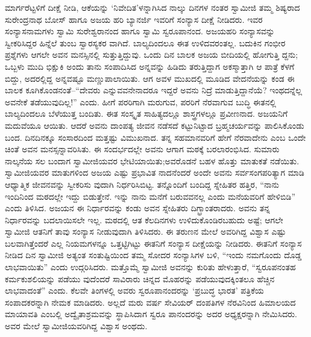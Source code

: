 ಮಾರ್ಗರೆಟ್ಟಳಿಗೆ ದೀಕ್ಷೆ ನೀಡಿ, ಆಕೆಯನ್ನು ‘ನಿವೇದಿತ’ಳನ್ನಾಗಿಸಿದ ನಾಲ್ಕು ದಿನಗಳ ನಂತರ ಸ್ವಾಮೀಜಿ ತಮ್ಮ ಶಿಷ್ಯರಾದ ಸುರೇಂದ್ರನಾಥ ಬೋಸ್ ಹಾಗೂ ಅಜಯ ಹರಿ ಬ್ಯಾನರ್ಜಿ ಇವರಿಗೆ ಸಂನ್ಯಾಸ ದೀಕ್ಷೆ ನೀಡಿದರು. ಇವರ ಸಂನ್ಯಾಸನಾಮಗಳು ಸ್ವಾಮಿ ಸುರೇಶ್ವರಾನಂದ ಹಾಗೂ ಸ್ವಾಮಿ ಸ್ವರೂಪಾನಂದ. ಅಜಯಹರಿ ಸಂನ್ಯಾಸವನ್ನು ಸ್ವೀಕರಿಸಿದ್ದರ ಹಿನ್ನೆಲೆ ತುಂಬ ಸ್ವಾರಸ್ಯಕರ ವಾಗಿದೆ. ಬಾಲ್ಯದಿಂದಲೂ ಈತ ಉಳಿದವರಂತಲ್ಲ. ಬದುಕಿನ ಗಂಭೀರ ಪ್ರಶ್ನೆಗಳು ಆಗಲೇ ಅವನ ಮನಸ್ಸಿನಲ್ಲಿ ಸುತ್ತುತ್ತಿದ್ದುವು. ಒಂದು ದಿನ ಬಾಲಕ ಅಜಯ ಬೀದಿಯಲ್ಲಿ ಹೋಗುತ್ತಿ ದ್ದನು; ಒಬ್ಬಳು ಮುದಿ ಭಿಕ್ಷುಕಿ ಅಂದು ತಾನು ಸಂಪಾದಿಸಿದ ಅನ್ನವನ್ನು ಹಿಡಿದು ತರುತ್ತಿದ್ದಾಗ ಅಕಸ್ಮಾತ್ತಾಗಿ ಆ ಪಾತ್ರೆ ಕೆಳಗೆ ಬಿದ್ದು, ಅದರಲ್ಲಿದ್ದ ಅನ್ನವಷ್ಟೂ ಮಣ್ಣುಪಾಲಾಯಿತು. ಆಗ ಅವಳ ಮುಖದಲ್ಲಿ ಮೂಡಿದ ವೇದನೆಯನ್ನು ಕಂಡ ಈ ಬಾಲಕ ಕೂಗಿಕೊಂಡನಂತೆ–“ದೇವರು ಎನ್ನುವವನೇನಾದರೂ ಇದ್ದರೆ ಅವನು ನಿದ್ರೆ ಮಾಡುತ್ತಿದ್ದಾನೆಯೆ? ಇಂಥದನ್ನೆಲ್ಲ ಅವನೇಕೆ ತಡೆಯುವುದಿಲ್ಲ!” ಎಂದು. ಹೀಗೆ ಪರರಿಗಾಗಿ ಮರುಗುವ, ಪರರಿಗೆ ನೆರವಾಗುವ ಬುದ್ಧಿ ಈತನಲ್ಲಿ ಬಾಲ್ಯದಿಂದಲೂ ಬೆಳೆಯುತ್ತ ಬಂದಿತು. ಈತ ಸಂಸ್ಕೃತ ಸಾಹಿತ್ಯದಲ್ಲೂ ಶಾಸ್ತ್ರಗಳಲ್ಲೂ ಪ್ರವೀಣನಾದ. ಅಜಯನಿಗೆ ಮದುವೆಯೂ ಆಯಿತು. ಆದರೆ ಅವನು ದಾಂಪತ್ಯ ಜೀವನ ನಡೆಸದೆ ಕಟ್ಟುನಿಟ್ಟಾದ ಬ್ರಹ್ಮಚರ್ಯವನ್ನು ಪಾಲಿಸಿಕೊಂಡು ಬಂದ. ದಿನದಿನಕ್ಕೂ ಸಂಸಾರದಿಂದ ಮತ್ತಷ್ಟು ವಿಮುಖನಾದ. ತನ್ನ ಸಹಮಾನವರಿಗೆ ಹೇಗೆ ನೆರವಾದೇನು ಎಂಬ ಒಂದೇ ಚಿಂತೆ ಅವನ ಮನಸ್ಸನ್ನಾವರಿಸಿತು. ಈ ಸಂದರ್ಭದಲ್ಲೇ ಅವನು ಆಗಾಗ ಮಠಕ್ಕೆ ಬರಲಾರಂಭಿಸಿದ. ಸುಮಾರು ನಾಲ್ಕನೆಯ ಸಲ ಬಂದಾಗ ಸ್ವಾಮೀಜಿಯವರ ಭೇಟಿಯಾಯಿತು;ಅವರೊಡನೆ ಬಹಳ ಹೊತ್ತು ಮಾತುಕತೆ ನಡೆಯಿತು. ಸ್ವಾಮೀಜಿಯವರ ಮಾತುಗಳಿಂದ ಅಜಯ ಎಷ್ಟು ಪ್ರಭಾವಿತ ನಾದನೆಂದರೆ ಅಂದೇ ಅವನು ಸರ್ವಸಂಗಪರಿತ್ಯಾಗ ಮಾಡಿ ಆಧ್ಯಾತ್ಮಿಕ ಜೀವನವನ್ನು ಸ್ವೀಕರಿಸು ವುದಾಗಿ ನಿರ್ಧರಿಸಿಬಿಟ್ಟ. ತನ್ನೊಂದಿಗೆ ಬಂದಿದ್ದ ಸ್ನೇಹಿತರ ಹತ್ತಿರ, “ನಾನು ಇಂದಿನಿಂದ ಮಠದಲ್ಲೇ ಇದ್ದು ಬಿಡುತ್ತೇನೆ. ಇನ್ನು ನಾನು ಮನೆಗೆ ಬರುವವನಲ್ಲ ಎಂದು ಮನೆಯವರಿಗೆ ಹೇಳಿಬಿಡಿ” ಎಂದು ತಿಳಿಸಿದ. ಅಜಯನ ಈ ನಿರ್ಧಾರವನ್ನು ಕಂಡು ಅವನ ಸ್ನೇಹಿತರು ದಿಗ್ಭ್ರಾಂತರಾದರು. ಅವನು ತನ್ನ ನಿರ್ಧಾರವನ್ನು ಬದಲಾಯಿಸಲೇ ಇಲ್ಲ. ಮಠದಲ್ಲಿ ಆತ ಕೆಲದಿನಗಳು ಉಳಿದುಕೊಂಡಿರಬಹುದು ಅಷ್ಟೆ; ಆಗಲೇ ಸ್ವಾಮೀಜಿ ಆತನಿಗೆ ತಾವು ಸಂನ್ಯಾಸ ನೀಡುವುದಾಗಿ ತಿಳಿಸಿದರು. ಈ ತರುಣನ ಮೇಲೆ ಅವರಿಗಿದ್ದ ವಿಶ್ವಾಸ ಎಷ್ಟು ಬಲವಾಗಿತ್ತೆಂದರೆ ಎಲ್ಲ ನಿಯಮಗಳನ್ನೂ ಒತ್ತಟ್ಟಿಗಿಟ್ಟು ಈತನಿಗೆ ಸಂನ್ಯಾಸ ದೀಕ್ಷೆಯನ್ನು ನೀಡಿದರು. ಈತನಿಗೆ ಸಂನ್ಯಾಸ ನೀಡಿದ ದಿನ ಸ್ವಾಮೀಜಿ ಅತ್ಯಂತ ಸಂತುಷ್ಟಿಯಿಂದ ತಮ್ಮ ಸೋದರ ಸಂನ್ಯಾಸಿಗಳ ಬಳಿ, “ಇಂದು ನಮಗೊಂದು ದೊಡ್ಡ ಲಾಭವಾಯಿತು” ಎಂದು ಉದ್ಗರಿಸಿದರು. ಮತ್ತೊಮ್ಮೆ ಸ್ವಾಮೀಜಿ ಅವನನ್ನು ಕುರಿತು ಹೇಳುತ್ತಾರೆ, “ಸ್ವರೂಪನಂತಹ ಕರ್ಮಕುಶಲಿಯನ್ನು ಪಡೆಯು ವುದೆಂದರೆ ಸಾವಿರಾರು ಚಿನ್ನದ ಮೊಹರನ್ನು ಪಡೆಯುವುದಕ್ಕಿಂತಲೂ ಹೆಚ್ಚಿನ ಲಾಭವಾದಂತೆ” ಎಂದು. ಕೆಲವೇ ತಿಂಗಳಲ್ಲಿ ಅವರು ಸ್ವರೂಪಾನಂದರನ್ನು ‘ಪ್ರಬುದ್ಧ ಭಾರತ’ ಪತ್ರಿಕೆಯ ಸಂಪಾದಕರನ್ನಾಗಿ ನೇಮಕ ಮಾಡಿದರು. ಅಲ್ಲದೆ ಮರು ವರ್ಷ ಸೇವಿಯರ್ ದಂಪತಿಗಳ ನೆರವಿನಿಂದ ಹಿಮಾಲಯದ ಮಾಯಾವತಿ ಎಂಬಲ್ಲಿ ಅದ್ವೈತಾಶ್ರಮವನ್ನು ಸ್ಥಾಪಿಸಿದಾಗ ಸ್ವರೂ ಪಾನಂದರನ್ನು ಅದರ ಅಧ್ಯಕ್ಷರನ್ನಾಗಿ ನೇಮಿಸಿದರು. ಅವರ ಮೇಲೆ ಸ್ವಾಮೀಜಿಯವರಿಗಿದ್ದ ವಿಶ್ವಾಸ ಅಂಥದು.

